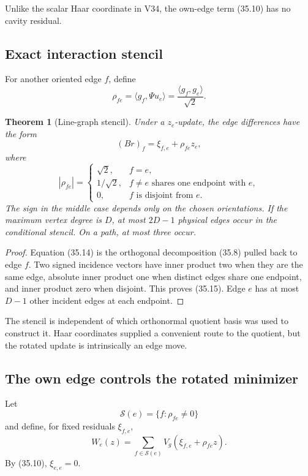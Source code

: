 \documentclass[11pt]{article}
\newtheorem{theorem}{Theorem}[section]
\theoremstyle{remark}
\begin{document}
Unlike the scalar Haar coordinate in V34, the own-edge term (35.10) has
no cavity residual.

\subsection{Exact interaction stencil}

For another oriented edge \(f\), define
\[
 \rho_{fe}=\langle g_f,\Psi u_e\rangle
 =\frac{\langle g_f,g_e\rangle}{\sqrt2}.           \tag{35.13}
\]

\begin{theorem}[Line-graph stencil]
\label{thm:v17v35-stencil}
Under a \(z_e\)-update, the edge differences have the form
\[
 (Br)_f=\xi_{f,e}+\rho_{fe}z_e,                    \tag{35.14}
\]
where
\[
 |\rho_{fe}|=
 \begin{cases}
 \sqrt2,&f=e,\\
 1/\sqrt2,&f\ne e\text{ shares one endpoint with }e,\\
 0,&f\text{ is disjoint from }e.
 \end{cases}                                      \tag{35.15}
\]
The sign in the middle case depends only on the chosen orientations.
If the maximum vertex degree is \(D\), at most \(2D-1\) physical edges
occur in the conditional stencil.  On a path, at most three occur.
\end{theorem}

\begin{proof}
Equation (35.14) is the orthogonal decomposition (35.8) pulled back to
edge \(f\).  Two signed incidence vectors have inner product two when
they are the same edge, absolute inner product one when distinct edges
share one endpoint, and inner product zero when disjoint.  This proves
(35.15).  Edge \(e\) has at most \(D-1\) other incident edges at each
endpoint.
\end{proof}

The stencil is independent of which orthonormal quotient basis was used
to construct it.  Haar coordinates supplied a convenient route to the
quotient, but the rotated update is intrinsically an edge move.

\subsection{The own edge controls the rotated minimizer}

Let
\[
 \mathcal S(e)=\{f:\rho_{fe}\ne0\}                \tag{35.16}
\]
and define, for fixed residuals \(\xi_{f,e}\),
\[
 W_e(z)=\sum_{f\in\mathcal S(e)}
 V_g(\xi_{f,e}+\rho_{fe}z).                        \tag{35.17}
\]
By (35.10), \(\xi_{e,e}=0\).
\end{document}
